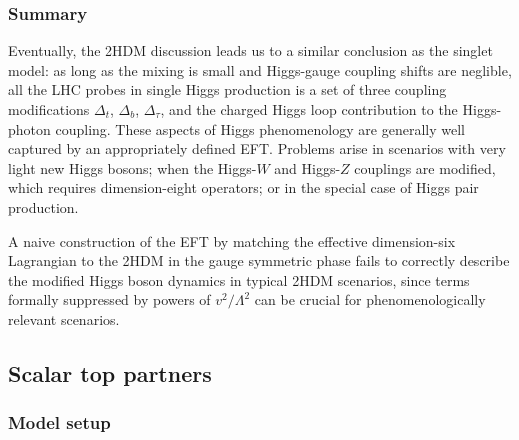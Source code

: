 \subsubsection{Summary}

Eventually, the 2HDM discussion leads us to a similar conclusion as
the singlet model: as long as the mixing is small and Higgs-gauge
coupling shifts are neglible, all the LHC probes in single Higgs
production is a set of three coupling modifications $\Delta_t$,
$\Delta_b$, $\Delta_\tau$, and the charged Higgs loop contribution to
the Higgs-photon coupling. These aspects of Higgs phenomenology are
generally well captured by an appropriately defined EFT. Problems
arise in scenarios with very light new Higgs bosons; when the
Higgs-$W$ and Higgs-$Z$ couplings are modified, which requires
dimension-eight operators; or in the special case of Higgs pair
production.

A naive construction of the EFT by matching the effective
dimension-six Lagrangian to the 2HDM in the gauge symmetric phase
fails to correctly describe the modified Higgs boson dynamics in
typical 2HDM scenarios, since terms formally suppressed by powers of
$v^2/\Lambda^2$ can be crucial for phenomenologically relevant
scenarios.



\subsection{Scalar top partners}
\label{sec:validity_stops}

\subsubsection{Model setup}

